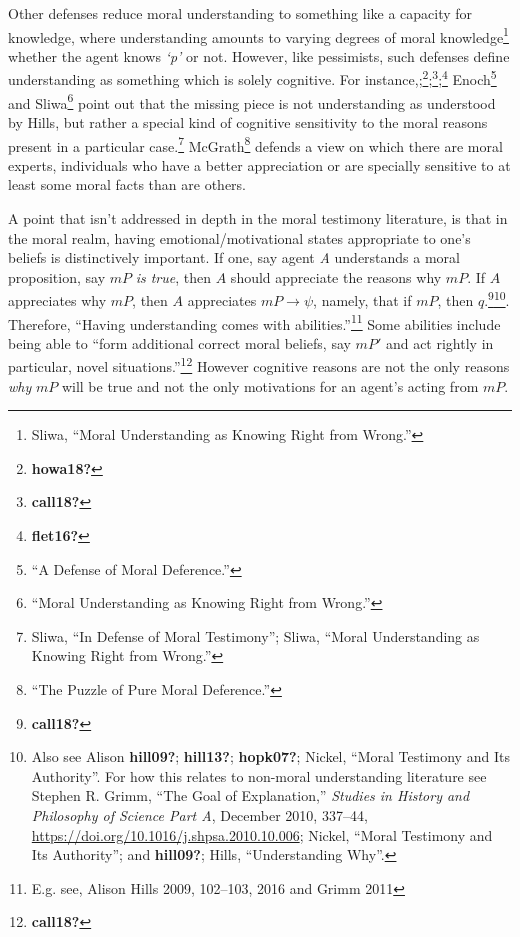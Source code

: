 \documentclass[
  12pt,
]{book}
\theoremstyle{definition}
\theoremstyle{definition}
\theoremstyle{definition}
\theoremstyle{definition}
\theoremstyle{remark}
\begin{document}
Other defenses reduce moral understanding to something like a capacity for knowledge, where understanding amounts to varying degrees of moral knowledge\footnote{Sliwa, {``Moral {Understanding} as {Knowing Right} from {Wrong}.''}} whether the agent knows \emph{`p'} or not. However, like pessimists, such defenses define understanding as something which is solely cognitive. For instance,;\footnote{\textbf{howa18?}};\footnote{\textbf{call18?}};\footnote{\textbf{flet16?}} Enoch\footnote{{``A {Defense} of {Moral Deference}.''}} and Sliwa\footnote{{``Moral {Understanding} as {Knowing Right} from {Wrong}.''}} point out that the missing piece is not understanding as understood by Hills, but rather a special kind of cognitive sensitivity to the moral reasons present in a particular case.\footnote{Sliwa, {``In Defense of Moral Testimony''}; Sliwa, {``Moral {Understanding} as {Knowing Right} from {Wrong}.''}} McGrath\footnote{{``The {Puzzle} of {Pure Moral Deference}.''}} defends a view on which there are moral experts, individuals who have a better appreciation or are specially sensitive to at least some moral facts than are others.

A point that isn't addressed in depth in the moral testimony literature, is that in the moral realm, having emotional/motivational states appropriate to one's beliefs is distinctively important. If one, say agent \emph{A} understands a moral proposition, say \(mP\) \emph{is true}, then \(A\) should appreciate the reasons why \(mP\). If \(A\) appreciates why \(mP\), then \(A\) appreciates \(mP \rightarrow \psi\), namely, that if \(mP\), then \(q\).\footnote{\textbf{call18?}}\footnote{Also see Alison \textbf{hill09?}; \textbf{hill13?}; \textbf{hopk07?}; Nickel, {``Moral {Testimony} and Its {Authority}''}. For how this relates to non-moral understanding literature see Stephen R. Grimm, {``The Goal of Explanation,''} \emph{Studies in History and Philosophy of Science Part A}, December 2010, 337--44, \url{https://doi.org/10.1016/j.shpsa.2010.10.006}; Nickel, {``Moral {Testimony} and Its {Authority}''}; and \textbf{hill09?}; Hills, {``Understanding {Why}''}.}. Therefore, ``Having understanding comes with abilities.''\footnote{E.g. see, Alison Hills 2009, 102--103, 2016 and Grimm 2011} Some abilities include being able to ``form additional correct moral beliefs, say \(mP'\) and act rightly in particular, novel situations.''\footnote{\textbf{call18?}} However cognitive reasons are not the only reasons \emph{why} \(mP\) will be true and not the only motivations for an agent's acting from \(mP\).
\end{document}
